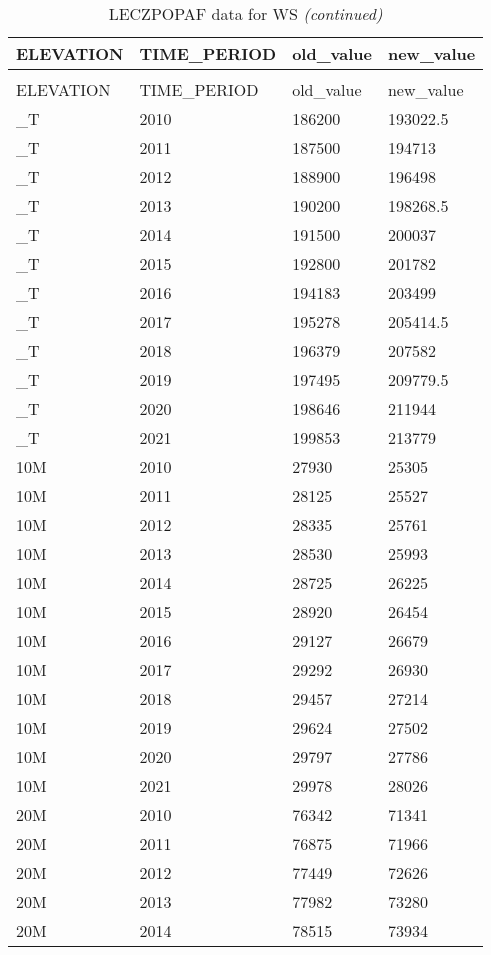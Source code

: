 
\begin{longtable}[t]{llll}
\caption{LECZPOPAF data for WS}\\
\toprule
ELEVATION & TIME\_PERIOD & old\_value & new\_value\\
\midrule
\endfirsthead
\caption[]{LECZPOPAF data for WS \textit{(continued)}}\\
\toprule
ELEVATION & TIME\_PERIOD & old\_value & new\_value\\
\midrule
\endhead

\endfoot
\bottomrule
\endlastfoot
\_T & 2010 & 186200 & 193022.5\\
\_T & 2011 & 187500 & 194713\\
\_T & 2012 & 188900 & 196498\\
\_T & 2013 & 190200 & 198268.5\\
\_T & 2014 & 191500 & 200037\\
\addlinespace
\_T & 2015 & 192800 & 201782\\
\_T & 2016 & 194183 & 203499\\
\_T & 2017 & 195278 & 205414.5\\
\_T & 2018 & 196379 & 207582\\
\_T & 2019 & 197495 & 209779.5\\
\addlinespace
\_T & 2020 & 198646 & 211944\\
\_T & 2021 & 199853 & 213779\\
10M & 2010 & 27930 & 25305\\
10M & 2011 & 28125 & 25527\\
10M & 2012 & 28335 & 25761\\
\addlinespace
10M & 2013 & 28530 & 25993\\
10M & 2014 & 28725 & 26225\\
10M & 2015 & 28920 & 26454\\
10M & 2016 & 29127 & 26679\\
10M & 2017 & 29292 & 26930\\
\addlinespace
10M & 2018 & 29457 & 27214\\
10M & 2019 & 29624 & 27502\\
10M & 2020 & 29797 & 27786\\
10M & 2021 & 29978 & 28026\\
20M & 2010 & 76342 & 71341\\
\addlinespace
20M & 2011 & 76875 & 71966\\
20M & 2012 & 77449 & 72626\\
20M & 2013 & 77982 & 73280\\
20M & 2014 & 78515 & 73934\\

\end{longtable}
